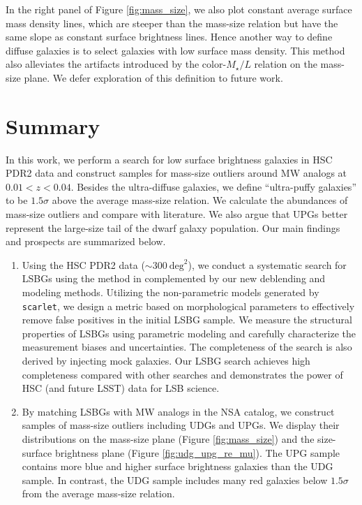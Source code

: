 \documentclass[twocolumn,astrosymb,twocolappendix]{aastex631}
\newcommand{\code}[1]{\texttt{#1}}
\begin{document}
\begin{CJK*}{UTF8}{gbsn}
In the right panel of Figure \ref{fig:mass_size}, we also plot constant average surface mass density lines, which are steeper than the mass-size relation but have the same slope as constant surface brightness lines. Hence another way to define diffuse galaxies is to select galaxies with low surface mass density. This method also alleviates the artifacts introduced by the color-$M_\star/L$ relation on the mass-size plane. We defer exploration of this definition to future work.  


\section{Summary}\label{sec:summary}
In this work, we perform a search for low surface brightness galaxies in HSC PDR2 data and construct samples for mass-size outliers around MW analogs at $0.01 < z < 0.04$. Besides the ultra-diffuse galaxies, we define ``ultra-puffy galaxies'' to be $1.5\sigma$ above the average mass-size relation. We calculate the abundances of mass-size outliers and compare with literature. We also argue that UPGs better represent the large-size tail of the dwarf galaxy population. Our main findings and prospects are summarized below. 

\begin{enumerate}
    \item Using the HSC PDR2 data ($\sim 300\ \mathrm{deg}^{2}$), we conduct a systematic search for LSBGs using the method in \citet{Greco2018} complemented by our new deblending and modeling methods. Utilizing the non-parametric models generated by \code{scarlet}, we design a metric based on morphological parameters to effectively remove false positives in the initial LSBG sample. We measure the structural properties of LSBGs using parametric modeling and carefully characterize the measurement biases and uncertainties. The completeness of the search is also derived by injecting mock galaxies. Our LSBG search achieves high completeness compared with other searches and demonstrates the power of HSC (and future LSST) data for LSB science. 
    
    \item By matching LSBGs with MW analogs in the NSA catalog, we construct samples of mass-size outliers including UDGs and UPGs. We display their distributions on the mass-size plane (Figure \ref{fig:mass_size}) and the size-surface brightness plane (Figure \ref{fig:udg_upg_re_mu}). The UPG sample contains more blue and higher surface brightness galaxies than the UDG sample. In contrast, the UDG sample includes many red galaxies below $1.5\sigma$ from the average mass-size relation.
    

\end{enumerate}
\end{CJK*}
\end{document}
